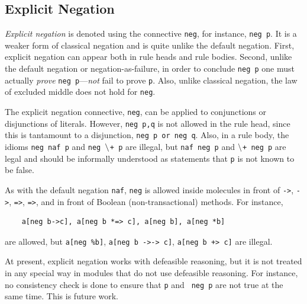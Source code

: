 \documentclass[11pt]{article}
\newcommand{\PLGNAF}{\mbox{\tt \ensuremath{\tt\backslash}+}\xspace}
\newcommand{\SILKNAF}{{{\tt naf}}\xspace}
\begin{document}
\subsection{Explicit Negation}
\label{sec-explicit-negation}

\emph{Explicit negation} is denoted using the connective {\tt neg}, for
instance, {\tt neg p}. It is a weaker form of classical negation and is
quite unlike the default negation. First, explicit negation can appear both
in rule heads and rule bodies. Second, unlike the default negation or
negation-as-failure, in order to conclude {\tt neg p} one must actually
\emph{prove} {\tt neg p}---\emph{not} fail to prove {\tt p}. Also, unlike
classical negation, the law of excluded middle does not hold for {\tt neg}.

The explicit negation connective, {\tt neg}, can be applied to conjunctions
or disjunctions of literals. However, {\tt neg p,q} is not allowed in the
rule head, since this is tantamount to a disjunction, {\tt neg p or neg q}.  
Also, in a rule body, the idioms {\tt neg naf p} and {\tt neg \PLGNAF p} are
illegal, but {\tt naf neg p} and {\tt \PLGNAF neg p} are legal and should be
informally understood as statements that {\tt p} is not known to be false. 

As with the default negation \SILKNAF, {\tt neg} is allowed inside molecules 
in front of {\tt ->}, {\tt *->}, {\tt =>}, {\tt *=>}, and in front of
Boolean (non-transactional) methods. For instance,
\begin{verbatim}
    a[neg b->c], a[neg b *=> c], a[neg b], a[neg *b]
\end{verbatim}
are allowed, but {\tt a[neg \%b]}, {\tt a[neg b ->-> c]}, {\tt a[neg b
  +> c]} are illegal.  

At present, explicit negation works with defeasible reasoning, but it is
not treated in any special way in modules that do not use defeasible reasoning.
For instance, no consistency check is done to ensure that {\tt p} and {\tt
  neg p} are not true at the same time. This is future work.
\end{document}
